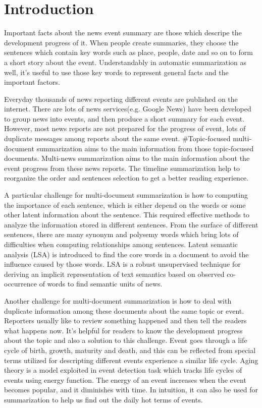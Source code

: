 \documentclass{acm_proc_article-sp}
\begin{document}
%
\section{Introduction}
%

Important facts about the news event summary are those which descripe the development progress of it.
When people create summaries, they choose the sentences which contain key words such as place, people, date and so on to form a short story about the event.
Understandably in automatic summarization as well, it's useful to use those key words to represent general facts and the important factors.

Everyday thousands of news reporting different events are published on the internet. 
There are lots of news services(e.g. Google News) have been developed to group news into events, and then produce a short summary for each event.
However, most news reports are not prepared for the progress of event, lots of duplicate messages among reports about the same event. 
#Topic-focused multi-document summarization aims to the main information from those topic-focused documents. 
Multi-news summarization aims to the main information about the event progress from these news reports.
The timeline summarization help to reorganize the order and sentences selection to get a better reading experience.

A particular challenge for multi-document summarization is how to computing the importance of each sentence, which is either depend on the words or some other latent information about the sentence.
This required effective methods to analyze the information stored in different sentences.
From the surface of different sentences, there are many synonym and polysemy words which bring lots of difficulties when computing relationships among sentences.
Latent semantic analysis (LSA) \cite{1990-Deerwester-p391-407} is introduced to find the core words in a document to avoid the influence caused by those words.
LSA is a robust unsupervised technique for deriving an implicit representation of text semantics based on observed co-occurrence of words to find semantic units of news.


Another challenge for multi-document summarization is how to deal with duplicate information among these documents about the same topic or event.
Reporters usually like to review something happened and then tell the readers what happens now. 
It's helpful for readers to know the development progress about the topic and also a solution to this challenge.
Event goes through a life cycle of birth, growth, maturity and death, and this can be reflected from special terms utilized for descripting different events experience a similar life cycle. 
Aging theory \cite{chen2003life} is a model exploited in event detection task which tracks life cycles of events using energy function. 
The energy of an event increases when the event becomes popular, and it diminishes with time. 
In intuition, it can also be used for summarization to help us find out the daily hot terms of events. 
\end{document}
